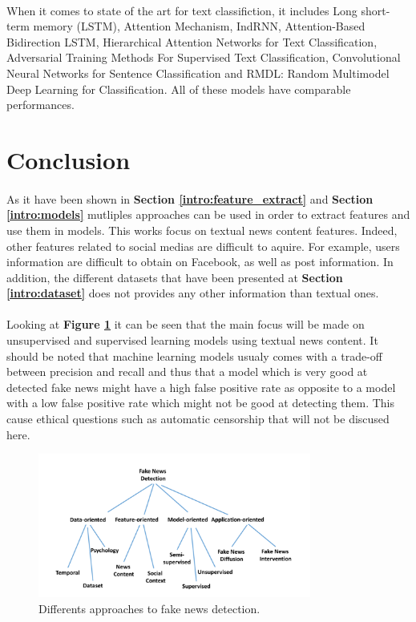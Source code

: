 \paragraph{}
When it comes to state of the art for text classifiction, it includes Long short-term memory (LSTM)\cite{Hochreiter1997LongSM}, Attention Mechanism\cite{Vaswani2017AttentionIA}, IndRNN\cite{Li2018}, Attention-Based Bidirection LSTM\cite{zhou-etal-2016-attention}, Hierarchical Attention Networks for Text Classification\cite{yang_hierarchical_2016}, Adversarial Training Methods For Supervised Text Classification\cite{miyato_adversarial_2016}, Convolutional Neural Networks for Sentence Classification\cite{kim_convolutional_2014} and RMDL: Random Multimodel Deep Learning for Classification\cite{kowsari_rmdl:_2018}. All of these models have comparable performances. 
\section{Conclusion}
\paragraph{} As it have been shown in \textbf{Section \ref{intro:feature_extract}} and \textbf{Section \ref{intro:models}} mutliples approaches can be used in order to extract features and use them in models. This works focus on textual news content features. Indeed, other features related to social medias are difficult to aquire. For example, users information are difficult to obtain on Facebook, as well as post information. In addition, the different datasets that have been presented at \textbf{Section \ref{intro:dataset}} does not provides any other information than textual ones. 

\paragraph{} Looking at \textbf{Figure \ref{fig:intro:features}} it can be seen that the main focus will be made on unsupervised and supervised learning models using textual news content. It should be noted that machine learning models usualy comes with a trade-off between precision and recall and thus that a model which is very good at detected fake news might have a high false positive rate as opposite to a model with a low false positive rate which might not be good at detecting them. This cause ethical questions such as automatic censorship that will not be discused here. 

\begin{figure}
	\centering
	\includegraphics[width=0.8\textwidth]{chapter/images/introduction/features}
	\caption{Differents approaches to fake news detection.}
	\label{fig:intro:features}
\end{figure}